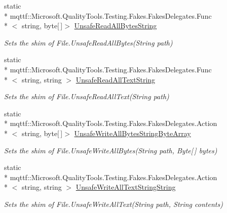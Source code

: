\begin{DoxyCompactItemize}
static \\*
mqttf\-::\-Microsoft.\-Quality\-Tools.\-Testing.\-Fakes.\-Fakes\-Delegates.\-Func\\*
$<$ string, byte\mbox{[}$\,$\mbox{]}$>$ \hyperlink{class_system_1_1_i_o_1_1_fakes_1_1_shim_file_add1bcb01bbe1c2ae5ed0a20c671bf3ac}{Unsafe\-Read\-All\-Bytes\-String}
\begin{DoxyCompactList}\small\item\em Sets the shim of File.\-Unsafe\-Read\-All\-Bytes(\-String path)\end{DoxyCompactList}\item 
static \\*
mqttf\-::\-Microsoft.\-Quality\-Tools.\-Testing.\-Fakes.\-Fakes\-Delegates.\-Func\\*
$<$ string, string $>$ \hyperlink{class_system_1_1_i_o_1_1_fakes_1_1_shim_file_a2a5687885e721e02dc470c871b9156fe}{Unsafe\-Read\-All\-Text\-String}
\begin{DoxyCompactList}\small\item\em Sets the shim of File.\-Unsafe\-Read\-All\-Text(\-String path)\end{DoxyCompactList}\item 
static \\*
mqttf\-::\-Microsoft.\-Quality\-Tools.\-Testing.\-Fakes.\-Fakes\-Delegates.\-Action\\*
$<$ string, byte\mbox{[}$\,$\mbox{]}$>$ \hyperlink{class_system_1_1_i_o_1_1_fakes_1_1_shim_file_a95b3246e7b048e0297a5fa5719fbcec6}{Unsafe\-Write\-All\-Bytes\-String\-Byte\-Array}
\begin{DoxyCompactList}\small\item\em Sets the shim of File.\-Unsafe\-Write\-All\-Bytes(\-String path, Byte\mbox{[}$\,$\mbox{]} bytes)\end{DoxyCompactList}\item 
static \\*
mqttf\-::\-Microsoft.\-Quality\-Tools.\-Testing.\-Fakes.\-Fakes\-Delegates.\-Action\\*
$<$ string, string $>$ \hyperlink{class_system_1_1_i_o_1_1_fakes_1_1_shim_file_a034bb3bde19a6f78525691eef8ca958d}{Unsafe\-Write\-All\-Text\-String\-String}
\begin{DoxyCompactList}\small\item\em Sets the shim of File.\-Unsafe\-Write\-All\-Text(\-String path, String contents)\end{DoxyCompactList}\item 

\end{DoxyCompactItemize}
